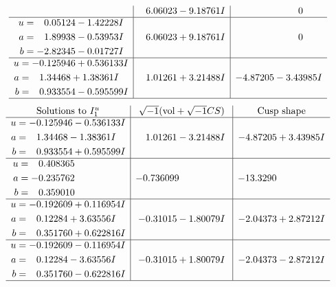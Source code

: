 \documentclass[1p]{elsarticle_modified}
\theoremstyle{definition}
\newcommand{\I}{\sqrt{-1}}
\begin{document}
$$\begin{array}{c|c|c}
 & \phantom{-}6.06023 - 9.18761 I & \phantom{-0.000000 } 0 \\ \hline\begin{aligned}
u &= \phantom{-}0.05124 - 1.42228 I \\
a &= \phantom{-}1.89938 - 0.53953 I \\
b &= -2.82345 - 0.01727 I\end{aligned}
 & \phantom{-}6.06023 + 9.18761 I & \phantom{-0.000000 } 0 \\ \hline\begin{aligned}
u &= -0.125946 + 0.536133 I \\
a &= \phantom{-}1.34468 + 1.38361 I \\
b &= \phantom{-}0.933554 - 0.595599 I\end{aligned}
 & \phantom{-}1.01261 + 3.21488 I & -4.87205 - 3.43985 I\\
 \hline 
 \end{array}$$\newpage$$\begin{array}{c|c|c}  
\text{Solutions to }I^u_{1}& \I (\text{vol} + \sqrt{-1}CS) & \text{Cusp shape}\\
 \hline 
\begin{aligned}
u &= -0.125946 - 0.536133 I \\
a &= \phantom{-}1.34468 - 1.38361 I \\
b &= \phantom{-}0.933554 + 0.595599 I\end{aligned}
 & \phantom{-}1.01261 - 3.21488 I & -4.87205 + 3.43985 I \\ \hline\begin{aligned}
u &= \phantom{-}0.408365\phantom{ +0.000000I} \\
a &= -0.235762\phantom{ +0.000000I} \\
b &= \phantom{-}0.359010\phantom{ +0.000000I}\end{aligned}
 & -0.736099\phantom{ +0.000000I} & -13.3290\phantom{ +0.000000I} \\ \hline\begin{aligned}
u &= -0.192609 + 0.116954 I \\
a &= \phantom{-}0.12284 + 3.63556 I \\
b &= \phantom{-}0.351760 + 0.622816 I\end{aligned}
 & -0.31015 - 1.80079 I & -2.04373 + 2.87212 I \\ \hline\begin{aligned}
u &= -0.192609 - 0.116954 I \\
a &= \phantom{-}0.12284 - 3.63556 I \\
b &= \phantom{-}0.351760 - 0.622816 I\end{aligned}
 & -0.31015 + 1.80079 I & -2.04373 - 2.87212 I\\
 \hline 
 \end{array}$$\newpage\newpage\renewcommand{\arraystretch}{1}
\end{document}
